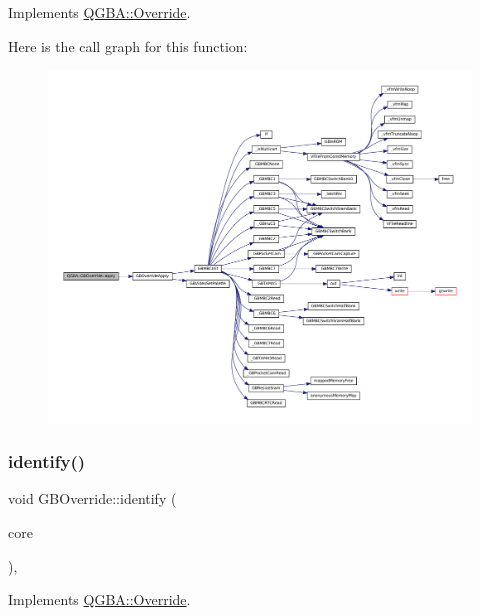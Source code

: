 Implements \mbox{\hyperlink{class_q_g_b_a_1_1_override_af7d6d72e9344c21b6133a18240ac0935}{Q\+G\+B\+A\+::\+Override}}.

Here is the call graph for this function\+:
\nopagebreak
\begin{figure}[H]
\begin{center}
\leavevmode
\includegraphics[width=350pt]{class_q_g_b_a_1_1_g_b_override_a0b0437da44fc94de35887d80440bf089_cgraph}
\end{center}
\end{figure}
\mbox{\label{class_q_g_b_a_1_1_g_b_override_a287ae6b1d0a643f36652f72e22a1483e}} 
\subsubsection{\texorpdfstring{identify()}{identify()}}
{\footnotesize\ttfamily void G\+B\+Override\+::identify (\begin{DoxyParamCaption}\item[{const struct m\+Core $\ast$}]{core }\end{DoxyParamCaption})\hspace{0.3cm}{\ttfamily [override]}, {\ttfamily [virtual]}}



Implements \mbox{\hyperlink{class_q_g_b_a_1_1_override_aac1ad966769d5424736654fdc69a3725}{Q\+G\+B\+A\+::\+Override}}.


